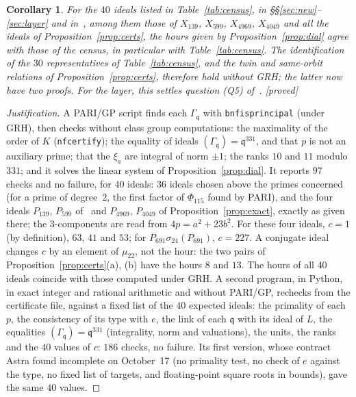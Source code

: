 \documentclass[11pt,a4paper]{amsart}
\theoremstyle{plain}
\newtheorem{corollary}[proposition]{Corollary}
\theoremstyle{definition}
\newcommand{\q}{\mathfrak{q}}
\newcommand{\st}[1]{\textup{\textsf{\small[#1]}}}
\newcommand{\DEM}{\st{proved}}
\begin{document}
\begin{corollary}\label{cor:dial}
For the $40$ ideals listed in Table~\ref{tab:census}, in \S\S\ref{sec:new}--\ref{sec:layer} and in~\cite{Gau26}, among them those of $X_{139}$, $X_{599}$, $X_{4969}$, $X_{4049}$ and all the ideals of Proposition~\ref{prop:certs}, the hours given by Proposition~\ref{prop:dial} agree with those of the census, in particular with Table~\ref{tab:census}. The identification of the $30$ representatives of Table~\ref{tab:census}, and the twin and same-orbit relations of Proposition~\ref{prop:certs}, therefore hold without GRH; the latter now have two proofs. For the layer, this settles question (Q5) of~\cite{Gau26}. \DEM
\end{corollary}

\begin{proof}[Justification]
A PARI/GP script finds each $\Gamma_\q$ with \texttt{bnfisprincipal} (under GRH), then checks without class group computations: the maximality of the order of $K$ (\texttt{nfcertify}); the equality of ideals $(\Gamma_\q)=\q^{331}$, and that $p$ is not an auxiliary prime; that the $\xi_a$ are integral of norm $\pm1$; the ranks $10$ and $11$ modulo $331$; and it solves the linear system of Proposition~\ref{prop:dial}. It reports $97$ checks and no failure, for $40$ ideals: $36$ ideals chosen above the primes concerned (for a prime of degree~$2$, the first factor of $\Phi_{115}$ found by PARI), and the four ideals $P_{139}$, $P_{599}$ of~\cite{Gau26} and $P_{4969}$, $P_{4049}$ of Proposition~\ref{prop:exact}, exactly as given there; the $3$-components are read from $4p=a^2+23b^2$. For these four ideals, $c=1$ (by definition), $63$, $41$ and $53$; for $P_{691}\sigma_{24}(P_{691})$, $c=227$. A conjugate ideal changes $c$ by an element of $\mu_{22}$, not the hour: the two pairs of Proposition~\ref{prop:certs}(a), (b) have the hours $8$ and $13$. The hours of all $40$ ideals coincide with those computed under GRH. A second program, in Python, in exact integer and rational arithmetic and without PARI/GP, rechecks from the certificate file, against a fixed list of the $40$ expected ideals: the primality of each $p$, the consistency of its type with $e$, the link of each $\q$ with its ideal of $L$, the equalities $(\Gamma_\q)=\q^{331}$ (integrality, norm and valuations), the units, the ranks and the $40$ values of $c$: $186$ checks, no failure. Its first version, whose contract Astra found incomplete on October~17 (no primality test, no check of $e$ against the type, no fixed list of targets, and floating-point square roots in bounds), gave the same $40$ values.
\end{proof}
\end{document}
